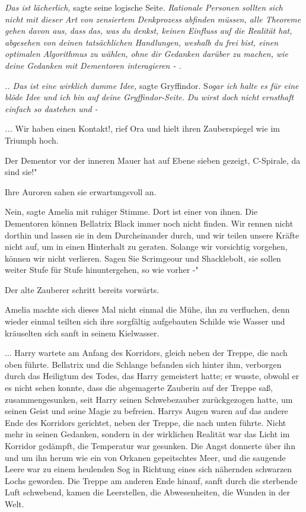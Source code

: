 \emph{Das ist lächerlich,} sagte seine logische Seite. \emph{Rationale Personen
sollten sich nicht mit dieser Art von zensiertem Denkprozess abfinden müssen,
alle Theoreme gehen davon aus, dass das, was du denkst, keinen Einfluss auf die
Realität hat, abgesehen von deinen tatsächlichen Handlungen, weshalb du frei
bist, einen optimalen Algorithmus zu wählen, ohne dir Gedanken darüber zu
machen, wie deine Gedanken mit Dementoren interagieren - .}

\emph{.. Das ist eine wirklich dumme Idee, }sagte Gryffindor. S\emph{ogar ich
halte es für eine }\emph{blöde Idee und ich bin auf deine Gryffindor-Seite.}
\emph{Du wirst doch nicht ernsthaft einfach so dastehen und -}

\emph{...}
\glqq Wir haben einen Kontakt!\grqq{}, rief Ora und hielt ihren Zauberspiegel
wie im Triumph hoch.

\glqq Der Dementor vor der inneren Mauer hat auf Ebene sieben gezeigt,
C-Spirale, da sind sie!"

Ihre Auroren sahen sie erwartungsvoll an.

\glqq Nein\grqq{}, sagte Amelia mit ruhiger Stimme. \glqq Dort ist einer von
ihnen. Die Dementoren können Bellatrix Black immer noch nicht finden. Wir rennen
nicht dorthin und lassen sie in dem Durcheinander durch, und wir teilen unsere
Kräfte nicht auf, um in einen Hinterhalt zu geraten. Solange wir vorsichtig
vorgehen, können wir nicht verlieren. Sagen Sie Scrimgeour und Shacklebolt, sie
sollen weiter Stufe für Stufe hinuntergehen, so wie vorher -"

Der alte Zauberer schritt bereits vorwärts.

Amelia machte sich dieses Mal nicht einmal die Mühe, ihn zu verfluchen, denn
wieder einmal teilten sich ihre sorgfältig aufgebauten Schilde wie Wasser und
kräuselten sich sanft in seinem Kielwasser.

... Harry wartete am Anfang des Korridors, gleich neben der Treppe, die nach
oben führte. Bellatrix und die Schlange befanden sich hinter ihm, verborgen
durch das Heiligtum des Todes, das Harry gemeistert hatte; er wusste, obwohl er
es nicht sehen konnte, dass die abgemagerte Zauberin auf der Treppe saß,
zusammengesunken, seit Harry seinen Schwebezauber zurückgezogen hatte, um seinen
Geist und seine Magie zu befreien. Harrys Augen waren auf das andere Ende des
Korridors gerichtet, neben der Treppe, die nach unten führte. Nicht mehr in
seinen Gedanken, sondern in der wirklichen Realität war das Licht im Korridor
gedämpft, die Temperatur war gesunken. Die Angst donnerte über ihn und um ihn
herum wie ein von Orkanen gepeitschtes Meer, und die saugende Leere war zu einem
heulenden Sog in Richtung eines sich nähernden schwarzen Lochs geworden. Die
Treppe am anderen Ende hinauf, sanft durch die sterbende Luft schwebend, kamen
die Leerstellen, die Abwesenheiten, die Wunden in der Welt.

